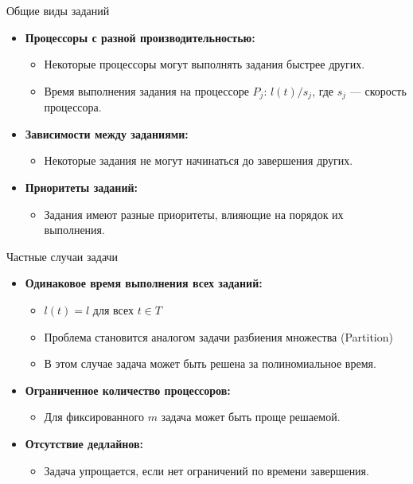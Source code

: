 \documentclass{beamer}
\begin{document}
\begin{frame}{Общие виды заданий}
    \begin{itemize}
        \item \textbf{Процессоры с разной производительностью:}
        \begin{itemize}
            \item Некоторые процессоры могут выполнять задания быстрее других.
            \item Время выполнения задания на процессоре \( P_j \): \( l(t)/s_j \), где \( s_j \) — скорость процессора.
        \end{itemize}
        \item \textbf{Зависимости между заданиями:}
        \begin{itemize}
            \item Некоторые задания не могут начинаться до завершения других.
        \end{itemize}
        \item \textbf{Приоритеты заданий:}
        \begin{itemize}
            \item Задания имеют разные приоритеты, влияющие на порядок их выполнения.
        \end{itemize}
    \end{itemize}
\end{frame}

\begin{frame}{Частные случаи задачи}
    \begin{itemize}
        \item \textbf{Одинаковое время выполнения всех заданий:}
        \begin{itemize}
            \item \( l(t) = l \) для всех \( t \in T \)
            \item Проблема становится аналогом задачи разбиения множества (Partition)
            \item В этом случае задача может быть решена за полиномиальное время.
        \end{itemize}
        \item \textbf{Ограниченное количество процессоров:}
        \begin{itemize}
            \item Для фиксированного \( m \) задача может быть проще решаемой.
        \end{itemize}
        \item \textbf{Отсутствие дедлайнов:}
        \begin{itemize}
            \item Задача упрощается, если нет ограничений по времени завершения.
        \end{itemize}
    \end{itemize}
\end{frame}
\end{document}

